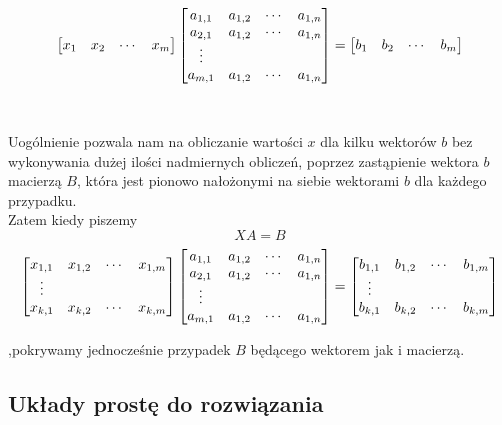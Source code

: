 \documentclass[12pt]{article}
\begin{document}
$$\centering
\begin{bmatrix}
    x_1 & x_2 & \cdots & x_m
\end{bmatrix}
\begin{bmatrix}
    a_{1,1} & a_{1,2} & \cdots &  a_{1,n} \\ 
    a_{2,1} & a_{1,2} & \cdots &  a_{1,n} \\ 
    \vdots \\
    a_{m,1} & a_{1,2} & \cdots &  a_{1,n} \\ 
\end{bmatrix}
=
\begin{bmatrix}
    b_1 & b_2 & \cdots & b_m
\end{bmatrix}
$$
\\
\\
Uogólnienie pozwala nam na obliczanie wartości $x$ dla kilku wektorów $b$ bez wykonywania dużej ilości nadmiernych obliczeń, poprzez zastąpienie wektora $b$ macierzą $B$, która jest pionowo nałożonymi na siebie wektorami $b$ dla każdego przypadku.
\\

Zatem kiedy piszemy $$XA = B$$ 
$$\centering
\begin{bmatrix}
    x_{1,1} & x_{1,2} & \cdots & x_{1,m} \\
    \vdots \\
    x_{k,1} & x_{k,2} & \cdots & x_{k,m} \\
\end{bmatrix}
\begin{bmatrix}
    a_{1,1} & a_{1,2} & \cdots &  a_{1,n} \\ 
    a_{2,1} & a_{1,2} & \cdots &  a_{1,n} \\ 
    \vdots \\
    a_{m,1} & a_{1,2} & \cdots &  a_{1,n} \\ 
\end{bmatrix}
=
\begin{bmatrix}
    b_{1,1} & b_{1,2} & \cdots & b_{1,m} \\
    \vdots \\
    b_{k,1} & b_{k,2} & \cdots & b_{k,m} \\
\end{bmatrix}
$$ 

\noindent ,pokrywamy jednocześnie przypadek $B$ będącego  wektorem jak i macierzą.

\subsection{Układy prostę do rozwiązania}
\end{document}
